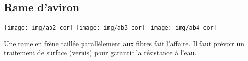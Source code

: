 \subsection{Rame d'aviron}

\begin{center} 
	\texttt{[image: img/ab2\_cor]}
	\texttt{[image: img/ab3\_cor]}
	\texttt{[image: img/ab4\_cor]}
\end{center}

Une rame en frêne taillée parallèlement aux fibres fait l'affaire. Il faut prévoir un traitement de surface (vernis) pour garantir la résistance à l'eau.



